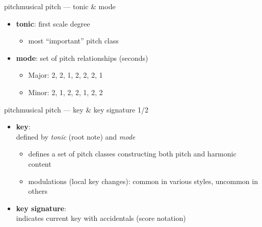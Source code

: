         \begin{frame}{pitch}{musical pitch --- tonic \& mode}
            \begin{itemize}
                \item	\textbf{tonic}: first scale degree
                        \pause
                        \begin{itemize}
                            \item	most ``important'' pitch class
                        \end{itemize}
                
                \item<2->	\textbf{mode}: set of pitch relationships (seconds)
                        \pause
                        \begin{itemize}
                            \item	Major: 2, 2, 1, 2, 2, 2, 1
                            \item	Minor: 2, 1, 2, 2, 1, 2, 2
                        \end{itemize}
            \end{itemize}
        \end{frame}
        
        \begin{frame}{pitch}{musical pitch --- key \& key signature 1/2}
            \begin{itemize}
                \item	\textbf{key}:\\ defined by \textit{tonic} (root note) and \textit{mode}
                        
                        \begin{itemize}
                            \item<2->	defines a set of pitch classes constructing both  pitch and harmonic content
                            
                            \item<3->	modulations (local key changes): common in various styles, uncommon in others
                        \end{itemize}
                \item<4->	\textbf{key signature}:\\ indicates current key with accidentals (score notation)
            \end{itemize}
        \end{frame}
        
